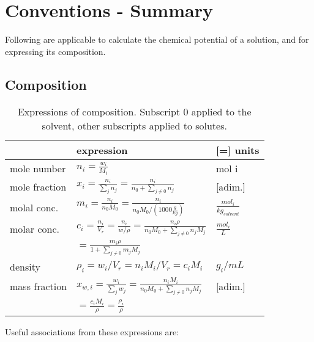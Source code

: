 \documentclass[onecolumn]{article}
\begin{document}
\section{Conventions - Summary} %
Following are applicable to calculate the chemical potential of a solution, and for expressing its composition.
\label{sec:conventions}
\subsection{Composition}
\label{subsec:composition}
\begin{table}[h]
\begin{tabular}{|lll|}
\hline
		      & expression                                                                                    & [=] units                     \\
\hline
mole number   & $n_i = \frac{w_i}{M_i}$                                                                                   & mol i                         \\
mole fraction & $x_i = \frac{n_i}{\sum_j{n_j}} =  \frac{n_i}{n_0 + \sum_{j \neq 0}{n_j}}$                         & [adim.]                       \\
molal  conc.  & $m_i = \frac{n_i}{n_0 M_0} = \frac{n_i}{n_0 M_0 / \left(1000 \frac{g}{kg} \right)}$               & $\frac{mol_i} {kg_{solvent}}$ \\
molar  conc.  & $c_i = \frac{n_i}{V_r} = \frac{n_i}{w/\rho} = \frac{n_i \rho}{n_0 M_0 + \sum_{j\neq 0}{n_j M_j}}$ & $\frac{mol_i}{L}$\\ 
              & $= \frac{m_i \rho}{1 + \sum_{j\neq 0}{m_j M_j}}$     &       \\
density 	  & $\rho_i = w_i/V_r = n_i M_i/V_r = c_i M_i$			 &	$g_i/mL$ \\
mass fraction & $x_{w,i} = \frac{w_i}{\sum_j{w_j}} =  \frac{n_i M_i}{n_0 M_0 + \sum_{j \neq 0}{n_j M_j}}$                         & [adim.]                       \\
			  & $= \frac{c_i M_i}{\rho} = \frac{\rho_i}{\rho}$  &  \\
\hline
\end{tabular}
\caption{Expressions of composition. Subscript 0 applied to the solvent, other subscripts applied to solutes.}
\label{table:composition_expr}
\end{table}
Useful associations from these expressions are: \\
\end{document}
